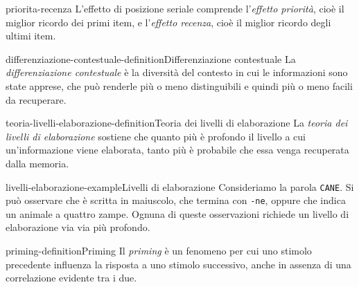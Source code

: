 \documentclass[preview]{standalone}
\begin{document}
\begin{snippet}{priorita-recenza}
    L'effetto di posizione seriale comprende l'\emph{effetto priorità}, cioè il
    miglior ricordo dei primi item, e l'\emph{effetto recenza}, cioè il miglior
    ricordo degli ultimi item.
\end{snippet}


\begin{snippetdefinition}{differenziazione-contestuale-definition}{Differenziazione contestuale}
    La \emph{differenziazione contestuale} è la diversità del contesto in cui le
    informazioni sono state apprese, che può renderle più o meno distinguibili e
    quindi più o meno facili da recuperare.
\end{snippetdefinition}


\begin{snippetdefinition}{teoria-livelli-elaborazione-definition}{Teoria dei livelli di elaborazione}
    La \emph{teoria dei livelli di elaborazione} sostiene che quanto più è
    profondo il livello a cui un'informazione viene elaborata, tanto più è
    probabile che essa venga recuperata dalla memoria.
\end{snippetdefinition}

\begin{snippetexample}{livelli-elaborazione-example}{Livelli di elaborazione}
    Consideriamo la parola \texttt{CANE}. Si può osservare che è scritta in
    maiuscolo, che termina con \texttt{-ne}, oppure che indica un animale a
    quattro zampe. Ognuna di queste osservazioni richiede un livello di
    elaborazione via via più profondo.
\end{snippetexample}

\begin{snippetdefinition}{priming-definition}{Priming}
    Il \emph{priming} è un fenomeno per cui uno stimolo precedente influenza la
    risposta a uno stimolo successivo, anche in assenza di una correlazione
    evidente tra i due.
\end{snippetdefinition}
\end{document}
